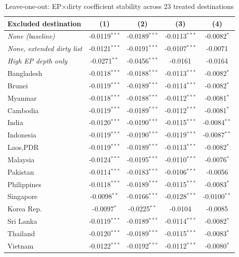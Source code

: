 \begin{table}[htbp]
\centering
\footnotesize
\caption{Leave-one-out: EP$\times$dirty coefficient stability across 23 treated destinations}
\label{tab:loo}
\begin{threeparttable}
\begin{tabular}{lcccc}
\toprule
Excluded destination & (1) & (2) & (3) & (4) \\
\midrule
\textit{None (baseline)} & -0.0119$^{***}$ & -0.0189$^{***}$ & -0.0113$^{***}$ & -0.0082$^{*}$ \\
\textit{None, extended dirty list} & -0.0121$^{***}$ & -0.0191$^{***}$ & -0.0107$^{***}$ & -0.0071 \\
\midrule
\textit{High EP depth only} & -0.0271$^{**}$ & -0.0456$^{***}$ & -0.0161 & -0.0164 \\
\midrule
Bangladesh & -0.0118$^{***}$ & -0.0188$^{***}$ & -0.0113$^{***}$ & -0.0082$^{*}$ \\
Brunei & -0.0119$^{***}$ & -0.0189$^{***}$ & -0.0114$^{***}$ & -0.0082$^{*}$ \\
Myanmar & -0.0118$^{***}$ & -0.0188$^{***}$ & -0.0112$^{***}$ & -0.0081$^{*}$ \\
Cambodia & -0.0119$^{***}$ & -0.0189$^{***}$ & -0.0112$^{***}$ & -0.0081$^{*}$ \\
India & -0.0120$^{***}$ & -0.0190$^{***}$ & -0.0115$^{***}$ & -0.0084$^{**}$ \\
Indonesia & -0.0119$^{***}$ & -0.0190$^{***}$ & -0.0119$^{***}$ & -0.0087$^{**}$ \\
Laos,PDR & -0.0119$^{***}$ & -0.0189$^{***}$ & -0.0113$^{***}$ & -0.0082$^{*}$ \\
Malaysia & -0.0124$^{***}$ & -0.0195$^{***}$ & -0.0110$^{***}$ & -0.0076$^{*}$ \\
Pakistan & -0.0114$^{***}$ & -0.0183$^{***}$ & -0.0106$^{***}$ & -0.0056 \\
Philippines & -0.0118$^{***}$ & -0.0189$^{***}$ & -0.0115$^{***}$ & -0.0083$^{*}$ \\
Singapore & -0.0098$^{**}$ & -0.0166$^{***}$ & -0.0128$^{***}$ & -0.0100$^{**}$ \\
Korea Rep. & -0.0097$^{*}$ & -0.0225$^{**}$ & -0.0104 & -0.0085 \\
Sri Lanka & -0.0119$^{***}$ & -0.0189$^{***}$ & -0.0114$^{***}$ & -0.0082$^{*}$ \\
Thailand & -0.0120$^{***}$ & -0.0189$^{***}$ & -0.0115$^{***}$ & -0.0083$^{*}$ \\
Vietnam & -0.0122$^{***}$ & -0.0192$^{***}$ & -0.0112$^{***}$ & -0.0080$^{*}$ \\

\end{tabular}
\end{threeparttable}
\end{table}
